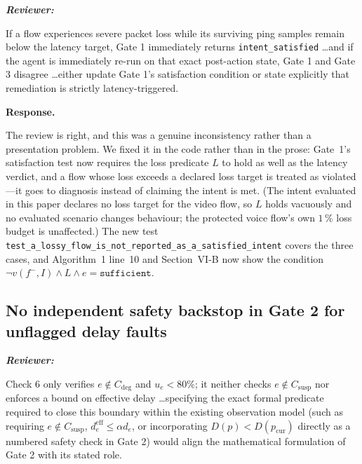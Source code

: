 \documentclass[11pt,a4paper]{article}
\newenvironment{reviewer}{\par\medskip\noindent\begin{minipage}{\linewidth}\small\itshape\color{quote}\textbf{Reviewer:}\par}{\end{minipage}\medskip\par}
\newenvironment{response}{\par\noindent\begin{minipage}{\linewidth}\small\textbf{Response.}\par}{\end{minipage}\medskip\par}
\begin{document}
\begin{reviewer}
If a flow experiences severe packet loss while its surviving ping samples
remain below the latency target, Gate 1 immediately returns
\texttt{intent\_satisfied} \dots and if the agent is immediately re-run on
that exact post-action state, Gate 1 and Gate 3 disagree \dots either
update Gate 1's satisfaction condition or state explicitly that remediation
is strictly latency-triggered.
\end{reviewer}

\begin{response}
The review is right, and this was a genuine inconsistency rather than a
presentation problem. We fixed it in the code rather than in the prose:
Gate~1's satisfaction test now requires the loss predicate $L$ to hold as
well as the latency verdict, and a flow whose loss exceeds a declared loss
target is treated as violated---it goes to diagnosis instead of claiming
the intent is met. (The intent evaluated in this paper declares no loss
target for the video flow, so $L$ holds vacuously and no evaluated
scenario changes behaviour; the protected voice flow's own $1\,\%$ loss
budget is unaffected.) The new test
\texttt{test\_a\_lossy\_flow\_is\_not\_reported\_as\_a\_satisfied\_intent}
covers the three cases, and Algorithm~1 line~10 and Section~VI-B now show
the condition $\neg v(f^-,I)\wedge L\wedge e=\texttt{sufficient}$.
\end{response}

\subsection{No independent safety backstop in Gate 2 for unflagged delay
faults}

\begin{reviewer}
Check 6 only verifies $e\notin C_{\mathrm{deg}}$ and $u_e<80\%$; it
neither checks $e\notin C_{\mathrm{susp}}$ nor enforces a bound on
effective delay \dots specifying the exact formal predicate required to
close this boundary within the existing observation model (such as
requiring $e\notin C_{\mathrm{susp}}$, $d^{\mathrm{eff}}_e\le\alpha d_e$,
or incorporating $D(p)<D(p_{\mathrm{cur}})$ directly as a numbered safety
check in Gate 2) would align the mathematical formulation of Gate 2 with
its stated role.
\end{reviewer}
\end{document}

